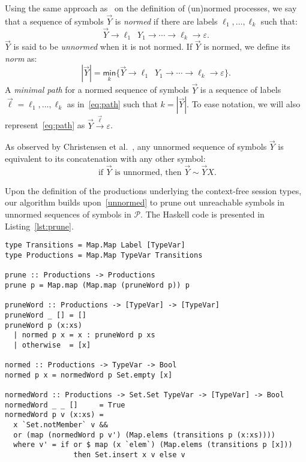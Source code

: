 Using the same approach as~\cite{DBLP:journals/iandc/ChristensenHS95} on
the definition of (un)normed processes, we say that a sequence of symbols
$\vec Y$ is \emph{normed} if there are labels $\ell_1,\ldots, \ell_k$
such that:
\begin{equation}
\label{eq:path}
	\vec Y \rightarrow \ell_1\enspace Y_1 \rightarrow \cdots \rightarrow \ell_k
	\rightarrow \varepsilon.
\end{equation}
$\vec Y$ is said to be \emph{unnormed} when it is not normed. If $\vec Y$
is normed, we define its \emph{norm} as:
\[ | \vec Y | = \underset{k}{\mathsf{min}} \{\vec Y \rightarrow \ell_1\enspace Y_1
\rightarrow \cdots \rightarrow \ell_k \rightarrow \varepsilon \}.\]
A \emph{minimal path} for a normed sequence of symbols $\vec Y$ is a sequence of
labels $\vec \ell = \ell_1,\ldots,\ell_k$ as in~\eqref{eq:path} such that
$k = | \vec Y |$. To ease notation, we will also represent~\eqref{eq:path} as
$\vec Y \xrightarrow{\vec \ell} \varepsilon$.


As observed by Christensen et al.~\cite{DBLP:journals/iandc/ChristensenHS95},
any unnormed sequence of symbols $\vec Y$ is equivalent to its concatenation
with any other symbol:
\begin{equation}
\label{unnormed}
\text{ if } \vec Y \text{ is unnormed, then } \vec Y \sim \vec Y X.
\end{equation}

Upon the definition of the productions underlying the context-free session types,
our algorithm builds upon~\eqref{unnormed} to prune out unreachable symbols in
unnormed sequences of symbols in $\mathcal{P}$. The Haskell code
is presented in Listing~\ref{lst:prune}.

\begin{lstlisting}[caption={Haskell code for the stage of pruning unnormed productions},label={lst:prune},captionpos=b]
type Transitions = Map.Map Label [TypeVar]
type Productions = Map.Map TypeVar Transitions

prune :: Productions -> Productions
prune p = Map.map (Map.map (pruneWord p)) p

pruneWord :: Productions -> [TypeVar] -> [TypeVar]
pruneWord _ [] = []
pruneWord p (x:xs)
  | normed p x = x : pruneWord p xs
  | otherwise  = [x]

normed :: Productions -> TypeVar -> Bool
normed p x = normedWord p Set.empty [x]

normedWord :: Productions -> Set.Set TypeVar -> [TypeVar] -> Bool
normedWord _ _ []     = True
normedWord p v (x:xs) =
  x `Set.notMember` v &&
  or (map (normedWord p v') (Map.elems (transitions p (x:xs))))
  where v' = if or $ map (x `elem`) (Map.elems (transitions p [x]))
                then Set.insert x v else v
\end{lstlisting}

